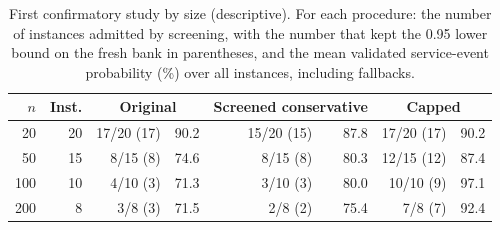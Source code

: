 \begin{table}[htbp]
\centering
\footnotesize
\caption{First confirmatory study by size (descriptive). For each procedure: the number of instances admitted by screening, with the number that kept the 0.95 lower bound on the fresh bank in parentheses, and the mean validated service-event probability (\%) over all instances, including fallbacks.}
\label{tab:conf-size}
\begin{tabular}{@{}rrrrrrrr@{}}
\toprule
$n$ & Inst. & \multicolumn{2}{c}{Original} & \multicolumn{2}{c}{Screened conservative} & \multicolumn{2}{c}{Capped}\\
\midrule
20 & 20 & 17/20 (17) & 90.2 & 15/20 (15) & 87.8 & 17/20 (17) & 90.2\\
50 & 15 & 8/15 (8) & 74.6 & 8/15 (8) & 80.3 & 12/15 (12) & 87.4\\
100 & 10 & 4/10 (3) & 71.3 & 3/10 (3) & 80.0 & 10/10 (9) & 97.1\\
200 & 8 & 3/8 (3) & 71.5 & 2/8 (2) & 75.4 & 7/8 (7) & 92.4\\
\bottomrule
\end{tabular}
\end{table}
